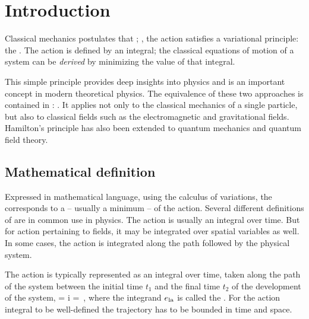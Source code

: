 \section{Introduction}
%
Classical mechanics postulates that ; \ie, the action satisfies a variational principle: the . The action is defined by an integral; the classical equations of motion of a system can be \emph{derived} by minimizing the value of that integral.

This simple principle provides deep insights into physics and is an important concept in modern theoretical physics.
The equivalence of these two approaches is contained in : . It applies not only to the classical mechanics of a single particle, but also to classical fields such as the electromagnetic and gravitational fields. Hamilton's principle has also been extended to quantum mechanics and quantum field theory.


\subsection{Mathematical definition}
%
Expressed in mathematical language, using the calculus of variations, the 
%
% 
corresponds to a  -- usually a minimum -- of the action. Several different definitions of  are in common use in physics. The action is usually an integral over time. But for action pertaining to fields, it may be integrated over spatial variables as well. In some cases, the action is integrated along the path followed by the physical system.

The action is typically represented as an integral over time, taken along the path of the system between the initial time $t_1$ and the final time $t_2$ of the development of the system,
%
%
\beq
  \action = \sint i\elag
          = \,,
\eeq
%
where the integrand $e_\text{la}$ is called the . For the action integral to be well-defined the trajectory has to be bounded in time and space.


